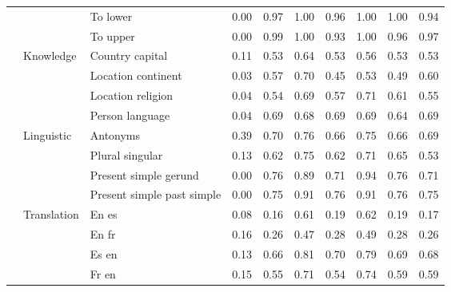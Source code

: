 \begin{center}
\begin{longtable}{lllrrrrrrr}
 &  & To lower & 0.00 & 0.97 & 1.00 & 0.96 & 1.00 & 1.00 & 0.94 \\
 &  & To upper & 0.00 & 0.99 & 1.00 & 0.93 & 1.00 & 0.96 & 0.97 \\
\cline{2-10}
 & \multirow[t]{4}{*}{Knowledge} & Country capital & 0.11 & 0.53 & 0.64 & 0.53 & 0.56 & 0.53 & 0.53 \\
 &  & Location continent & 0.03 & 0.57 & 0.70 & 0.45 & 0.53 & 0.49 & 0.60 \\
 &  & Location religion & 0.04 & 0.54 & 0.69 & 0.57 & 0.71 & 0.61 & 0.55 \\
 &  & Person language & 0.04 & 0.69 & 0.68 & 0.69 & 0.69 & 0.64 & 0.69 \\
\cline{2-10}
 & \multirow[t]{4}{*}{Linguistic} & Antonyms & 0.39 & 0.70 & 0.76 & 0.66 & 0.75 & 0.66 & 0.69 \\
 &  & Plural singular & 0.13 & 0.62 & 0.75 & 0.62 & 0.71 & 0.65 & 0.53 \\
 &  & Present simple gerund & 0.00 & 0.76 & 0.89 & 0.71 & 0.94 & 0.76 & 0.71 \\
 &  & Present simple past simple & 0.00 & 0.75 & 0.91 & 0.76 & 0.91 & 0.76 & 0.75 \\
\cline{2-10}
 & \multirow[t]{4}{*}{Translation} & En es & 0.08 & 0.16 & 0.61 & 0.19 & 0.62 & 0.19 & 0.17 \\
 &  & En fr & 0.16 & 0.26 & 0.47 & 0.28 & 0.49 & 0.28 & 0.26 \\
 &  & Es en & 0.13 & 0.66 & 0.81 & 0.70 & 0.79 & 0.69 & 0.68 \\
 &  & Fr en & 0.15 & 0.55 & 0.71 & 0.54 & 0.74 & 0.59 & 0.59 \\
\cline{1-10} \cline{2-10}
\bottomrule
\end{longtable}

\end{center}
\twocolumn